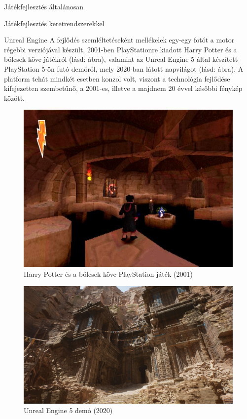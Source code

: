 \begin{MyChapter}{Játékfejlesztés általánosan}
\begin{MySection}{Játékfejlesztés keretrendszerekkel}
\begin{MySubSection}{Unreal Engine}
		A fejlődés szemléltetéseként mellékelek egy-egy fotót \cite{harry_potter_pic} \cite{unreal_official_website} a motor régebbi verziójával készült, 2001-ben PlayStationre kiadott Harry Potter és a bölcsek köve játékról (lásd:  ábra), valamint az Unreal Engine 5 által készített PlayStation 5-ön futó demóról, mely 2020-ban látott napvilágot (lásd:  ábra). A platform tehát mindkét esetben konzol volt, viszont a technológia fejlődése kifejezetten szembetűnő, a 2001-es, illetve a majdnem 20 évvel későbbi fénykép között.
		\begin{figure}[h!]
			\centering
			\includegraphics[scale=0.4]{kepek/unrealEngine/harry-potter-and-the-sorcerer-s-stone-ps.jpeg}
			\caption{Harry Potter és a bölcsek köve PlayStation játék (2001)}
			\label{fig:unrealEngine:harry-potter-and-the-sorcerer-s-stone-ps}
		\end{figure}
		\begin{figure}[h!]
			\centering
			\includegraphics[scale=0.16]{kepek/unrealEngine/First-look-at-Unreal_Engine_5.jpg}
			\caption{Unreal Engine 5 demó (2020)}
			\label{fig:unrealEngine:First-look-at-Unreal_Engine_5}
		\end{figure}
	

\end{MySubSection}
\end{MySection}
\end{MyChapter}
